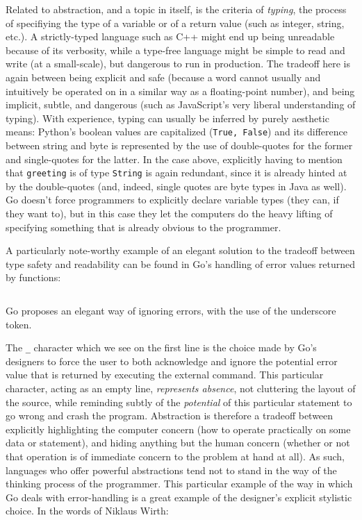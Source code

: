 Related to abstraction, and a topic in itself, is the criteria of \emph{typing}, the process of specifiying the type of a variable or of a return value (such as integer, string, etc.). A strictly-typed language such as C++ might end up being unreadable because of its verbosity, while a type-free language might be simple to read and write (at a small-scale), but dangerous to run in production. The tradeoff here is again between being explicit and safe (because a word cannot usually and intuitively be operated on in a similar way as a floating-point number), and being implicit, subtle, and dangerous (such as JavaScript's very liberal understanding of typing). With experience, typing can usually be inferred by purely aesthetic means: Python's boolean values are capitalized (\lstinline{True, False}) and its difference between string and byte is represented by the use of double-quotes for the former and single-quotes for the latter. In the case above, explicitly having to mention that \lstinline{greeting} is of type \lstinline{String} is again redundant, since it is already hinted at by the double-quotes (and, indeed, single quotes are byte types in Java as well). Go doesn't force programmers to explicitly declare variable types (they can, if they want to), but in this case they let the computers do the heavy lifting of specifying something that is already obvious to the programmer.

A particularly note-worthy example of an elegant solution to the tradeoff between type safety and readability can be found in Go's handling of error values returned by functions:

\begin{listing}
  \inputminted{go}{./corpus/error_handling.go}
  \caption{Go proposes an elegant way of ignoring errors, with the use of the underscore token.}
  \label{code:error-handling}
\end{listing}

The \lstinline{_} character which we see on the first line is the choice made by Go's designers to force the user to both acknowledge and ignore the potential error value that is returned by executing the external command. This particular character, acting as an empty line, \emph{represents absence}, not cluttering the layout of the source, while reminding subtly of the \emph{potential} of this particular statement to go wrong and crash the program. Abstraction is therefore a tradeoff between explicitly highlighting the computer concern (how to operate practically on some data or statement), and hiding anything but the human concern (whether or not that operation is of immediate concern to the problem at hand at all). As such, languages who offer powerful abstractions tend not to stand in the way of the thinking process of the programmer. This particular example of the way in which Go deals with error-handling is a great example of the designer's explicit stylistic choice. In the words of Niklaus Wirth:


